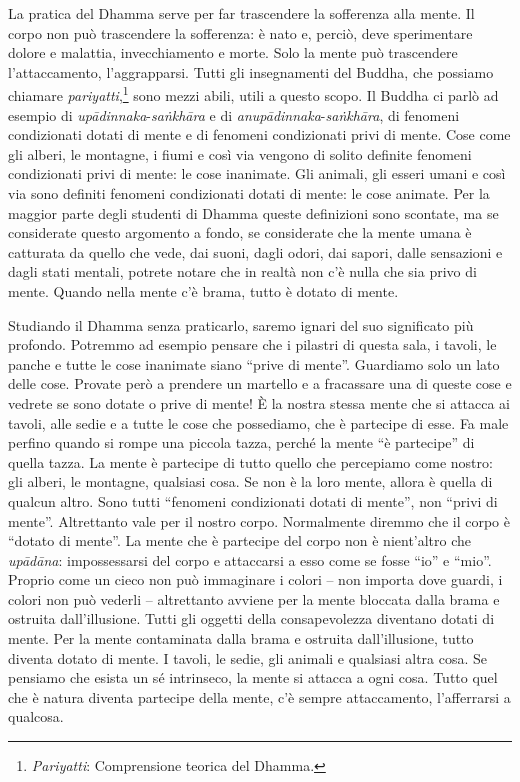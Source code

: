 La pratica del Dhamma serve per far trascendere la sofferenza alla
mente. Il corpo non può trascendere la sofferenza: è nato e, perciò,
deve sperimentare dolore e malattia, invecchiamento e morte. Solo la
mente può trascendere l'attaccamento, l'aggrapparsi. Tutti gli
insegnamenti del Buddha, che possiamo chiamare
\emph{pariyatti},\footnote{\emph{Pariyatti}: Comprensione teorica del Dhamma.}
sono mezzi abili, utili a questo scopo. Il Buddha ci
parlò ad esempio di \emph{upādinnaka}-\emph{saṅkhāra} e di
\emph{anupādinnaka}-\emph{saṅkhāra}, di fenomeni condizionati dotati di
mente e di fenomeni condizionati privi di mente. Cose come gli alberi,
le montagne, i fiumi e così via vengono di solito definite fenomeni
condizionati privi di mente: le cose inanimate. Gli animali, gli esseri
umani e così via sono definiti fenomeni condizionati dotati di mente: le
cose animate. Per la maggior parte degli studenti di Dhamma queste
definizioni sono scontate, ma se considerate questo argomento a fondo,
se considerate che la mente umana è catturata da quello che vede, dai
suoni, dagli odori, dai sapori, dalle sensazioni e dagli stati mentali,
potrete notare che in realtà non c'è nulla che sia privo di mente.
Quando nella mente c'è brama, tutto è dotato di mente.

Studiando il Dhamma senza praticarlo, saremo ignari del suo significato
più profondo. Potremmo ad esempio pensare che i pilastri di questa sala,
i tavoli, le panche e tutte le cose inanimate siano ``prive di mente''.
Guardiamo solo un lato delle cose. Provate però a prendere un martello e
a fracassare una di queste cose e vedrete se sono dotate o prive di
mente! È la nostra stessa mente che si attacca ai tavoli, alle sedie e a
tutte le cose che possediamo, che è partecipe di esse. Fa male perfino
quando si rompe una piccola tazza, perché la mente ``è partecipe'' di
quella tazza. La mente è partecipe di tutto quello che percepiamo come
nostro: gli alberi, le montagne, qualsiasi cosa. Se non è la loro mente,
allora è quella di qualcun altro. Sono tutti ``fenomeni condizionati
dotati di mente'', non ``privi di mente''. Altrettanto vale per il
nostro corpo. Normalmente diremmo che il corpo è ``dotato di mente''. La
mente che è partecipe del corpo non è nient'altro che \emph{upādāna}:
impossessarsi del corpo e attaccarsi a esso come se fosse ``io'' e
``mio''. Proprio come un cieco non può immaginare i colori -- non
importa dove guardi, i colori non può vederli -- altrettanto avviene per
la mente bloccata dalla brama e ostruita dall'illusione. Tutti gli
oggetti della consapevolezza diventano dotati di mente. Per la mente
contaminata dalla brama e ostruita dall'illusione, tutto diventa dotato
di mente. I tavoli, le sedie, gli animali e qualsiasi altra cosa. Se
pensiamo che esista un sé intrinseco, la mente si attacca a ogni cosa.
Tutto quel che è natura diventa partecipe della mente, c'è sempre
attaccamento, l'afferrarsi a qualcosa.

